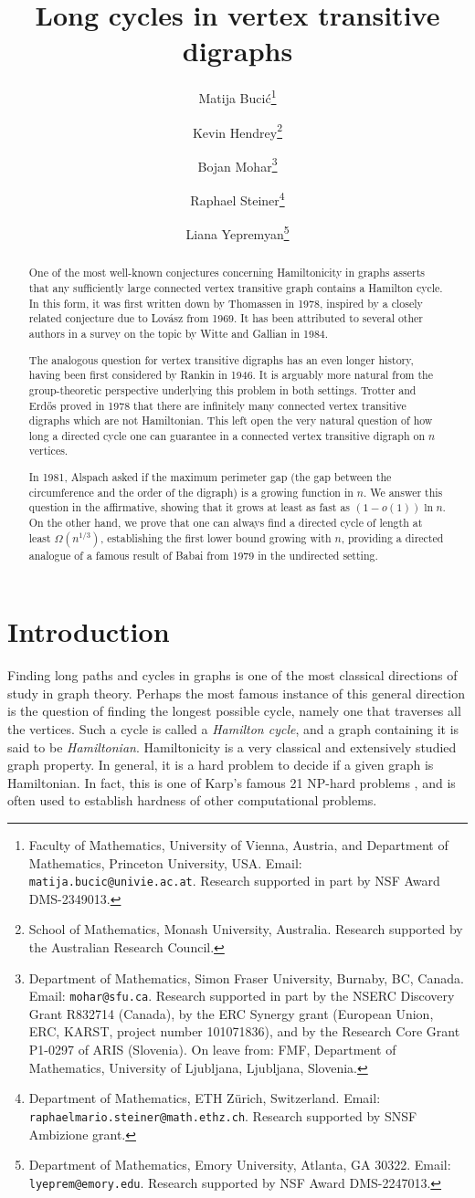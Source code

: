 \documentclass[english,11pt]{article}
\date{}
\title{Long cycles in vertex transitive digraphs}
\author{Matija Buci\'c\thanks{Faculty of Mathematics, University of Vienna, Austria, and Department of Mathematics, Princeton University, USA. Email: \texttt{matija.bucic@univie.ac.at}. Research supported in part by NSF Award DMS-2349013.} \and Kevin Hendrey\thanks{School of Mathematics, Monash University, Australia. Research supported by the Australian Research Council.} \and Bojan Mohar\thanks{Department of Mathematics, Simon Fraser University, Burnaby, BC, Canada. 
Email: \texttt{mohar@sfu.ca}. Research supported in part by the NSERC Discovery Grant R832714 (Canada), by the ERC Synergy grant (European Union, ERC, KARST, project number 101071836), and by the Research Core Grant P1-0297 of ARIS (Slovenia). On leave from: FMF, Department of Mathematics, University of Ljubljana, Ljubljana, Slovenia.} \and Raphael Steiner\thanks{Department of Mathematics, ETH Z\"{u}rich, Switzerland. Email: \texttt{raphaelmario.steiner@math.ethz.ch}. Research supported by SNSF Ambizione grant.} \and Liana Yepremyan\thanks{Department of Mathematics, Emory University, Atlanta, GA 30322. Email: {\tt lyeprem@emory.edu}. Research supported by NSF Award DMS-2247013.}}
\theoremstyle{definition}
\numberwithin{equation}{section}
\numberwithin{figure}{section}
\begin{document}
\maketitle
\begin{abstract}
One of the most well-known conjectures concerning Hamiltonicity in graphs asserts that any sufficiently large connected vertex transitive graph contains a Hamilton cycle. In this form, it was first written down by Thomassen in 1978, inspired by a closely related conjecture due to Lov\'asz from 1969. It has been attributed to several other authors in a survey on the topic by Witte and Gallian in 1984. 

The analogous question for vertex transitive digraphs has an even longer history, having been first considered by Rankin in 1946. It is arguably more natural from the group-theoretic perspective underlying this problem in both settings. Trotter and Erd\H{o}s proved in 1978 that there are infinitely many connected vertex transitive digraphs which are not Hamiltonian. This left open the very natural question of how long a directed cycle one can guarantee in a connected vertex transitive digraph on $n$ vertices. 

In 1981, Alspach asked if the maximum perimeter gap
(the gap between the circumference and the order of the digraph)
is a growing function in $n$. 
We answer this question in the affirmative, showing that it grows at least as fast as $(1-o(1)) \ln n$. 
On the other hand, we prove that one can always find a directed cycle of length at least $\Omega(n^{1/3})$, establishing the first lower bound growing with $n$, providing a directed analogue of a famous result of Babai from 1979 in the undirected setting.
\end{abstract} 

\section{Introduction}

Finding long paths and cycles in graphs is one of the most classical directions of study in graph theory. Perhaps the most famous instance of this general direction is the question of finding the longest possible cycle, namely one that traverses all the vertices. Such a cycle is called a \emph{Hamilton cycle}, and a graph containing it is said to be \emph{Hamiltonian}. Hamiltonicity is a very classical and extensively studied graph property. In general, it is a hard problem to decide if a given graph is Hamiltonian. In fact, this is one of Karp's famous 21 NP-hard problems \cite{karp}, and is often used to establish hardness of other computational problems.
\end{document}
